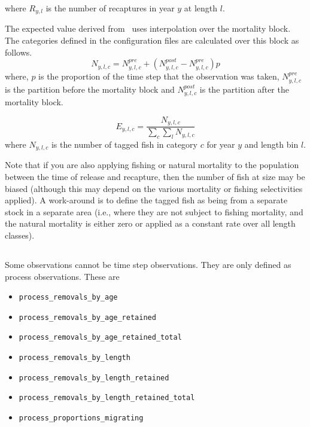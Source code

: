 where $R_{y,l}$ is the number of recaptures in year $y$ at length $l$.

The expected value derived from \CNAME\ uses interpolation over the mortality block. The categories defined in the configuration files are calculated over this block as follows.
\begin{equation}
	N_{y,l,c} = N^{pre}_{y,l,c} +   (N^{post}_{y,l,c} - N^{pre}_{y,l,c})p
\end{equation}
where, $p$ is the proportion of the time step that the observation was taken, \(N^{pre}_{y,l,c}\) is the partition before the mortality block and \(N^{post}_{y,l,c}\) is the partition after the mortality block.

\begin{equation}
	E_{y,l,c} = \frac{N_{y,l,c}}{\sum_c\sum_l N_{y,l,c}}
\end{equation}
where $N_{y,l,c}$ is the number of tagged fish in category \(c\) for year \(y\) and length bin \(l\).

Note that if you are also applying fishing or natural mortality to the population between the time of release and recapture, then the number of fish at size may be biased (although this may depend on the various mortality or fishing selectivities applied). A work-around is to define the tagged fish as being from a separate stock in a separate area (i.e., where they are not subject to fishing mortality, and the natural mortality is either zero or applied as a constant rate over all length classes).
\fi %

\ifAgeBased 
{}

\subsection{ \label{secProcessOnlyObservations}}

Some observations cannot be time step observations. They are only defined as process observations. These are

\begin{itemize}
	\item \texttt{process\_removals\_by\_age}
	\item \texttt{process\_removals\_by\_age\_retained}
	\item \texttt{process\_removals\_by\_age\_retained\_total}
	\item \texttt{process\_removals\_by\_length}
	\item \texttt{process\_removals\_by\_length\_retained}
	\item \texttt{process\_removals\_by\_length\_retained\_total}
	\item \texttt{process\_proportions\_migrating}
\end{itemize}

